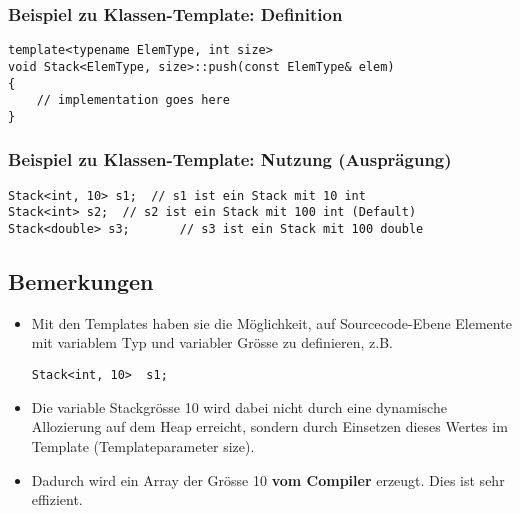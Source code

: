\subsubsection{Beispiel zu Klassen-Template: Definition}
\begin{minipage}{0.7\linewidth}
\vspace{-\baselineskip}
\begin{lstlisting}
template<typename ElemType, int size>
void Stack<ElemType, size>::push(const ElemType& elem)
{
	// implementation goes here
}
\end{lstlisting}
\end{minipage}

\subsubsection{Beispiel zu Klassen-Template: Nutzung (Ausprägung)}
\begin{minipage}{0.7\linewidth}
\vspace{-\baselineskip}
\begin{lstlisting}
Stack<int, 10> s1;	// s1 ist ein Stack mit 10 int
Stack<int> s2;	// s2 ist ein Stack mit 100 int (Default)
Stack<double> s3;		// s3 ist ein Stack mit 100 double
\end{lstlisting}
\end{minipage}

\subsection{Bemerkungen}
\begin{itemize}
	\item Mit den Templates haben sie die Möglichkeit, auf Sourcecode-Ebene Elemente mit variablem Typ und variabler Grösse zu definieren, z.B.\hspace{0.05\linewidth}
	\begin{minipage}{0.3\linewidth}
	\vspace{-\baselineskip}
\begin{lstlisting}
Stack<int, 10>	s1;
\end{lstlisting}
	\end{minipage}
	\item Die variable Stackgrösse 10 wird dabei nicht durch eine dynamische Allozierung auf dem Heap erreicht, sondern durch Einsetzen dieses Wertes im Template (Templateparameter size).
	\item Dadurch wird ein Array der Grösse 10 \textbf{vom Compiler} erzeugt. Dies ist sehr effizient.
\end{itemize}

